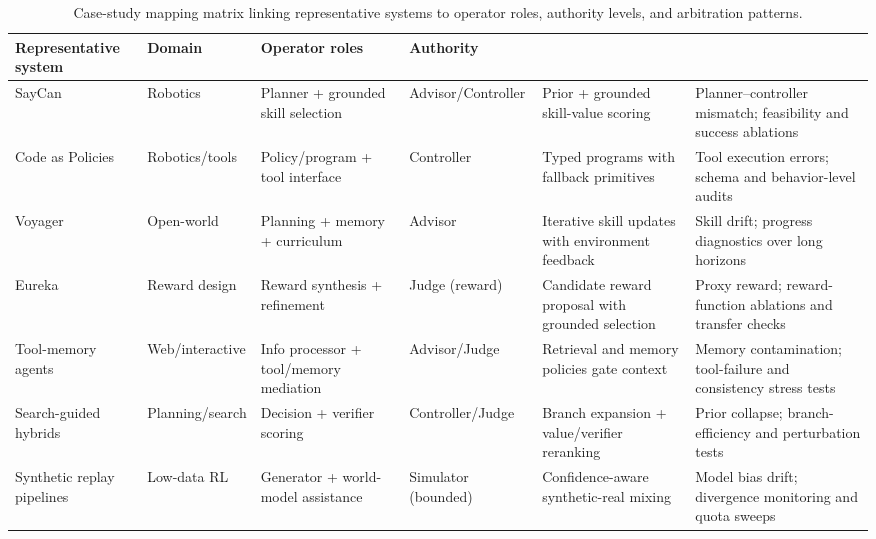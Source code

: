 ﻿\documentclass[conference]{IEEEtran}
\begin{document}
\clearpage
\begin{landscape}
\begin{table}[p]
\centering
\footnotesize
\setlength{\tabcolsep}{4pt}
\renewcommand{\arraystretch}{1.15}
\begin{tabularx}{0.98\linewidth}{P{2.8cm}P{2.0cm}P{3.0cm}P{2.3cm}Y Y}
\toprule
\textbf{Representative system} & \textbf{Domain} & \textbf{Operator roles} & \textbf{Authority} & \textbf{} & \textbf{}\\
\midrule
SayCan \cite{arxiv_p_2204_01691} & Robotics & Planner + grounded skill selection & Advisor/Controller & Prior + grounded skill-value scoring & Planner--controller mismatch; feasibility and success ablations \\
Code as Policies \cite{doi_p_10_1109_icra48891_2023_10160591} & Robotics/tools & Policy/program + tool interface & Controller & Typed programs with fallback primitives & Tool execution errors; schema and behavior-level audits \\
Voyager \cite{arxiv_p_2305_16291} & Open-world & Planning + memory + curriculum & Advisor & Iterative skill updates with environment feedback & Skill drift; progress diagnostics over long horizons \\
Eureka \cite{arxiv_p_2310_12931} & Reward design & Reward synthesis + refinement & Judge (reward) & Candidate reward proposal with grounded selection & Proxy reward; reward-function ablations and transfer checks \\
Tool-memory agents \cite{arxiv_p_2404_03648} & Web/interactive & Info processor + tool/memory mediation & Advisor/Judge & Retrieval and memory policies gate context & Memory contamination; tool-failure and consistency stress tests \\
Search-guided hybrids \cite{arxiv_p_2602_07848,doi_p_10_48448_q4pk_2g71} & Planning/search & Decision + verifier scoring & Controller/Judge & Branch expansion + value/verifier reranking & Prior collapse; branch-efficiency and perturbation tests \\
Synthetic replay pipelines \cite{arxiv_p_2602_02454,arxiv_p_2601_08107} & Low-data RL & Generator + world-model assistance & Simulator (bounded) & Confidence-aware synthetic-real mixing & Model bias drift; divergence monitoring and quota sweeps \\
\bottomrule
\end{tabularx}
\caption{Case-study mapping matrix linking representative systems to operator roles, authority levels, and arbitration patterns.}
\label{tab:case_mapping}
\end{table}
\end{landscape}
\clearpage
\end{document}
